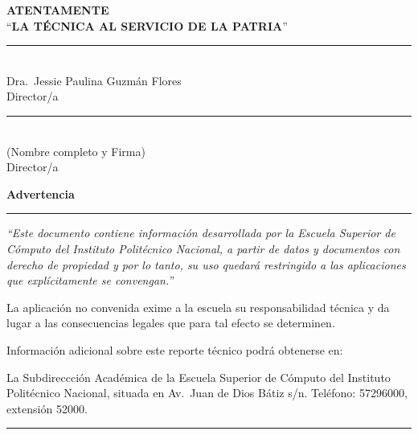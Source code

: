 \vspace{0.6cm}
\noindent\textbf{ATENTAMENTE}\\
``\textbf{LA T\'ECNICA AL SERVICIO DE LA PATRIA}''

\vspace{1.2cm}
\noindent
\begin{minipage}[t]{0.45\textwidth}
  \centering
  \rule{5cm}{0.4pt}\\[0.2cm]
  Dra.~Jessie Paulina Guzm\'an Flores\\
  Director/a
\end{minipage}
\hfill
\begin{minipage}[t]{0.45\textwidth}
  \centering
  \rule{5cm}{0.4pt}\\[0.2cm]
  (Nombre completo y Firma)\\
  Director/a
\end{minipage}

\newpage
\thispagestyle{empty}
\vspace*{4cm}
\begin{center}
  {\large\bfseries Advertencia}
\end{center}
\vspace{0.5cm}
\noindent\rule{\linewidth}{0.6pt}
\vspace{0.4cm}

\noindent\textit{``Este documento contiene informaci\'on desarrollada por la Escuela
Superior de C\'omputo del Instituto Polit\'ecnico Nacional, a partir de datos y
documentos con derecho de propiedad y por lo tanto, su uso quedar\'a
restringido a las aplicaciones que expl\'icitamente se convengan.''}

\vspace{0.4cm}
\noindent La aplicaci\'on no convenida exime a la escuela su responsabilidad t\'ecnica y
da lugar a las consecuencias legales que para tal efecto se determinen.

\vspace{0.5cm}
\noindent Informaci\'on adicional sobre este reporte t\'ecnico podr\'a obtenerse en:

\vspace{0.3cm}
\noindent La Subdireccci\'on Acad\'emica de la Escuela Superior de C\'omputo del Instituto
Polit\'ecnico Nacional, situada en Av.~Juan de Dios B\'atiz s/n. Tel\'efono:
57296000, extensi\'on 52000.

\vspace{0.5cm}
\noindent\rule{\linewidth}{0.6pt}

